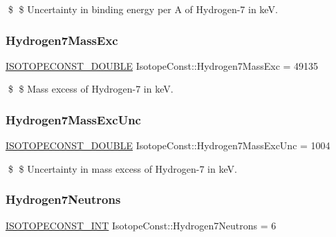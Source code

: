 \$ \$ Uncertainty in binding energy per A of Hydrogen-\/7 in keV. \mbox{\label{group___isotope_const-_hydrogen-_h7_gafaf0bddeeb98eac6ea4612d3542e7af4}} 
\subsubsection{\texorpdfstring{Hydrogen7\+Mass\+Exc}{Hydrogen7MassExc}}
{\footnotesize\ttfamily \mbox{\hyperlink{group___isotope_const-_macros_ga8f45a7272ce02c0b4c65c44636ed719a}{I\+S\+O\+T\+O\+P\+E\+C\+O\+N\+S\+T\+\_\+\+D\+O\+U\+B\+LE}} Isotope\+Const\+::\+Hydrogen7\+Mass\+Exc = 49135}

\$ \$ Mass excess of Hydrogen-\/7 in keV. \mbox{\label{group___isotope_const-_hydrogen-_h7_ga8afcd48f41a65548b7272de981946a26}} 
\subsubsection{\texorpdfstring{Hydrogen7\+Mass\+Exc\+Unc}{Hydrogen7MassExcUnc}}
{\footnotesize\ttfamily \mbox{\hyperlink{group___isotope_const-_macros_ga8f45a7272ce02c0b4c65c44636ed719a}{I\+S\+O\+T\+O\+P\+E\+C\+O\+N\+S\+T\+\_\+\+D\+O\+U\+B\+LE}} Isotope\+Const\+::\+Hydrogen7\+Mass\+Exc\+Unc = 1004}

\$ \$ Uncertainty in mass excess of Hydrogen-\/7 in keV. \mbox{\label{group___isotope_const-_hydrogen-_h7_ga1e5cbc1310d8cecf8198ea68e9d5fa4a}} 
\subsubsection{\texorpdfstring{Hydrogen7\+Neutrons}{Hydrogen7Neutrons}}
{\footnotesize\ttfamily \mbox{\hyperlink{group___isotope_const-_macros_ga5f18360b3e99483a35c32d789e62621c}{I\+S\+O\+T\+O\+P\+E\+C\+O\+N\+S\+T\+\_\+\+I\+NT}} Isotope\+Const\+::\+Hydrogen7\+Neutrons = 6}

